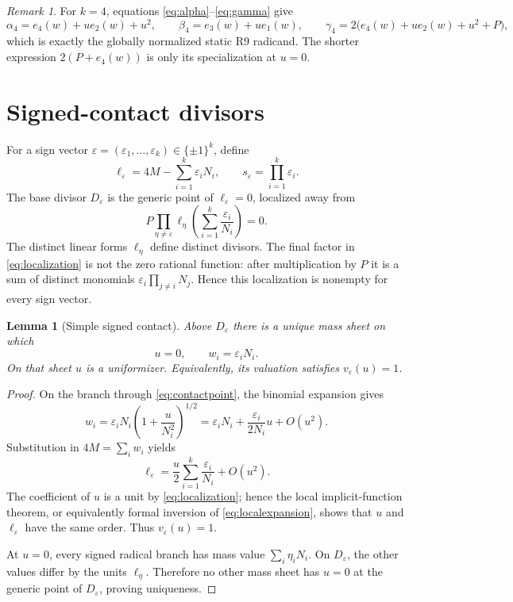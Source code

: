 \documentclass[11pt,a4paper]{article}
\newtheorem{lemma}[theorem]{Lemma}
\theoremstyle{definition}
\theoremstyle{remark}
\newtheorem{remark}[theorem]{Remark}
\newcommand{\eps}{\varepsilon}
\begin{document}
\begin{remark}
For $k=4$, equations \eqref{eq:alpha}--\eqref{eq:gamma} give
\[
 \alpha_4=e_4(w)+ue_2(w)+u^2,\qquad
 \beta_4=e_3(w)+ue_1(w),\qquad
 \gamma_4=2\bigl(e_4(w)+ue_2(w)+u^2+P\bigr),
\]
which is exactly the globally normalized static R9 radicand.  The shorter
expression $2(P+e_4(w))$ is only its specialization at $u=0$.
\end{remark}

\section{Signed-contact divisors}
\label{sec:contacts}

For a sign vector $\eps=(\eps_1,\ldots,\eps_k)\in\{\pm1\}^k$, define
\begin{equation}
 \ell_\eps=4M-\sum_{i=1}^k\eps_iN_i,
 \qquad s_\eps=\prod_{i=1}^k\eps_i.
 \label{eq:wall}
\end{equation}
The base divisor $D_\eps$ is the generic point of $\ell_\eps=0$, localized
away from
\begin{equation}
 P\prod_{\eta\neq\eps}\ell_\eta
 \left(\sum_{i=1}^k\frac{\eps_i}{N_i}\right)=0.
 \label{eq:localization}
\end{equation}
The distinct linear forms $\ell_\eta$ define distinct divisors.  The final
factor in \eqref{eq:localization} is not the zero rational function: after
multiplication by $P$ it is a sum of distinct monomials
$\eps_i\prod_{j\neq i}N_j$.  Hence this localization is nonempty for every
sign vector.

\begin{lemma}[Simple signed contact]
\label{lem:simplecontact}
Above $D_\eps$ there is a unique mass sheet on which
\begin{equation}
 u=0,\qquad w_i=\eps_iN_i.
 \label{eq:contactpoint}
\end{equation}
On that sheet $u$ is a uniformizer.  Equivalently, its valuation satisfies
$v_\eps(u)=1$.
\end{lemma}

\begin{proof}
On the branch through \eqref{eq:contactpoint}, the binomial expansion gives
\[
 w_i
 =\eps_iN_i\left(1+\frac{u}{N_i^2}\right)^{1/2}
 =\eps_iN_i+\frac{\eps_i}{2N_i}u+O(u^2).
\]
Substitution in $4M=\sum_iw_i$ yields
\begin{equation}
 \ell_\eps
 =\frac{u}{2}\sum_{i=1}^k\frac{\eps_i}{N_i}+O(u^2).
 \label{eq:localexpansion}
\end{equation}
The coefficient of $u$ is a unit by \eqref{eq:localization}; hence the local
implicit-function theorem, or equivalently formal inversion of
\eqref{eq:localexpansion}, shows that $u$ and $\ell_\eps$ have the same order.
Thus $v_\eps(u)=1$.

At $u=0$, every signed radical branch has mass value
$\sum_i\eta_iN_i$.  On $D_\eps$, the other values differ by the units
$\ell_\eta$.  Therefore no other mass sheet has $u=0$ at the generic point of
$D_\eps$, proving uniqueness.
\end{proof}
\end{document}
